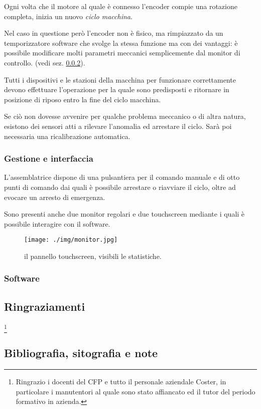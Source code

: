 \documentclass[a4paper,14pt,twoside]{extarticle} %
\begin{document}
Ogni volta che il motore al quale è connesso l'encoder compie una rotazione completa, inizia un nuovo \emph{ciclo macchina}.

Nel caso in questione però l'encoder non è fisico, ma rimpiazzato da un temporizzatore software che svolge la stessa funzione ma con dei vantaggi: è possibile modificare molti parametri meccanici semplicemente dal monitor di controllo. (vedi sez. \ref{sec:soft}).

Tutti i dispositivi e le stazioni della macchina per funzionare correttamente devono effettuare l'operazione per la quale sono predisposti e ritornare in posizione di riposo entro la fine del ciclo macchina.

Se ciò non dovesse avvenire per qualche problema meccanico o di altra natura, esistono dei sensori atti a rilevare l'anomalia ed arrestare il ciclo.
Sarà poi necessaria una ricalibrazione automatica.
\subsubsection{Gestione e interfaccia}
L'assemblatrice dispone di una pulsantiera per il comando manuale e di otto punti di comando dai quali è possibile arrestare o riavviare il ciclo, oltre ad evocare un arresto di emergenza.

Sono presenti anche due monitor regolari e due touchscreen mediante i quali è possibile interagire con il software.
\begin{figure}[ht!]
\centering \sf
\texttt{[image: ./img/monitor.jpg]}
\caption{\small \sf il pannello touchscreen, visibili le statistiche.}
\end{figure} 

\newpage
\subsubsection{Software}\label{sec:soft}

\subsection{Ringraziamenti}
\thanks{
Ringrazio i docenti del CFP e tutto il personale aziendale Coster, in particolare i manutentori al quale sono stato affiancato ed il tutor del periodo formativo in azienda.
}
\subsection{Bibliografia, sitografia e note}
\end{document}

